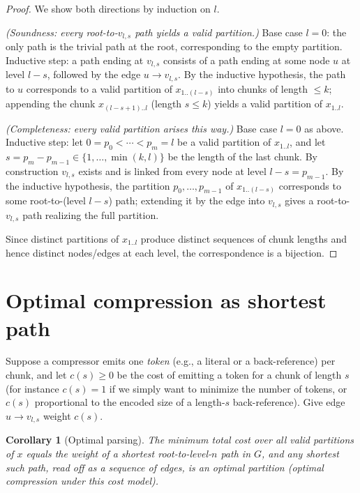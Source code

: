 \documentclass[11pt]{article}
\newtheorem{corollary}{Corollary}
\begin{document}
\begin{proof}
We show both directions by induction on $l$.

\smallskip
\noindent \emph{(Soundness: every root-to-$v_{l,s}$ path yields a valid partition.)}
Base case $l = 0$: the only path is the trivial path at the root, corresponding to the
empty partition. Inductive step: a path ending at $v_{l,s}$ consists of a path ending at
some node $u$ at level $l - s$, followed by the edge $u \to v_{l,s}$. By the inductive
hypothesis, the path to $u$ corresponds to a valid partition of $x_{1..(l-s)}$ into
chunks of length $\le k$; appending the chunk $x_{(l-s+1)..l}$ (length $s \le k$) yields
a valid partition of $x_{1..l}$.

\smallskip
\noindent \emph{(Completeness: every valid partition arises this way.)}
Base case $l = 0$ as above. Inductive step: let $0 = p_0 < \cdots < p_m = l$ be a valid
partition of $x_{1..l}$, and let $s = p_m - p_{m-1} \in \{1, \dots, \min(k,l)\}$ be the
length of the last chunk. By construction $v_{l,s}$ exists and is linked from every node
at level $l - s = p_{m-1}$. By the inductive hypothesis, the partition
$p_0, \dots, p_{m-1}$ of $x_{1..(l-s)}$ corresponds to some root-to-(level $l-s$) path;
extending it by the edge into $v_{l,s}$ gives a root-to-$v_{l,s}$ path realizing the
full partition.

\smallskip
Since distinct partitions of $x_{1..l}$ produce distinct sequences of chunk lengths and
hence distinct nodes/edges at each level, the correspondence is a bijection.
\end{proof}

\section{Optimal compression as shortest path}

Suppose a compressor emits one \emph{token} (e.g., a literal or a back-reference) per
chunk, and let $c(s) \ge 0$ be the cost of emitting a token for a chunk of length $s$
(for instance $c(s) = 1$ if we simply want to minimize the number of tokens, or $c(s)$
proportional to the encoded size of a length-$s$ back-reference). Give edge
$u \to v_{l,s}$ weight $c(s)$.

\begin{corollary}[Optimal parsing]
\label{cor:optimal}
The minimum total cost over all valid partitions of $x$ equals the weight of a shortest
root-to-level-$n$ path in $G$, and any shortest such path, read off as a sequence of
edges, is an optimal partition (optimal compression under this cost model).
\end{corollary}
\end{document}
